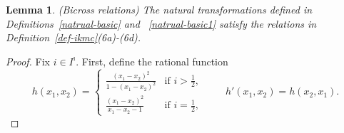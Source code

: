 \documentclass[a4,10pt]{amsart}
\numberwithin{equation}{section}
\newtheorem{Lemma}[Theorem]{Lemma}
\theoremstyle{definition}
\begin{document}
\begin{Lemma} \label{bicross1 downred} (Bicross relations) %
 The natural transformations defined in Definitions~\ref{natrual-basic} and ~\ref{natrual-basic1} satisfy the relations  in Definition~\ref{def-ikmc}(6a)-(6d). 
\end{Lemma}
\begin{proof} {Fix $i\in I^\imath$}. First, define the  rational function
\begin{equation}\label{ration-h123}
h(x_1, x_2)=\begin{cases} \frac{(x_1-x_2)^2}{1-(x_1-x_2)^2} & \text{if $i>\frac{1}{2}$,}\\ \frac{(x_1-x_2)^2}{x_1-x_2-1} 
& \text{if $i=\frac{1}{2}$, }\end{cases}
\qquad h'(x_1,x_2)=h(x_2, x_1).\end{equation}


\end{proof}
\end{document}
